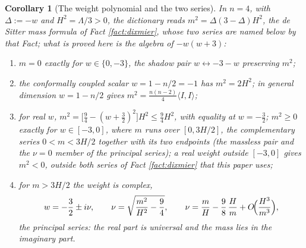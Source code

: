 \documentclass[11pt]{article}
\newtheorem{corollary}[theorem]{Corollary}
\theoremstyle{definition}
\newcommand{\ip}[2]{\langle #1, #2\rangle}
\begin{document}
\begin{corollary}[The weight polynomial and the two series]\label{cor:series}
In $n = 4$, with $\Delta := -w$ and $H^{2} = \Lambda/3 > 0$, the dictionary reads $m^{2} = \Delta(3-\Delta)H^{2}$, the de Sitter mass formula of Fact \ref{fact:dixmier}, whose two series are named below by that Fact; what is proved here is the algebra of $-w(w+3)$:
\begin{enumerate}
\item $m = 0$ exactly for $w \in \{0, -3\}$, the shadow pair $w \leftrightarrow -3-w$ preserving $m^{2}$;
\item the conformally coupled scalar $w = 1 - n/2 = -1$ has $m^{2} = 2H^{2}$; in general dimension $w = 1 - n/2$ gives $m^{2} = \tfrac{n(n-2)}{4}\ip{I}{I}$;
\item for real $w$, $m^{2} = \bigl[\tfrac94 - (w + \tfrac32)^{2}\bigr]H^{2} \le \tfrac94 H^{2}$, with equality at $w = -\tfrac32$; $m^{2} \ge 0$ exactly for $w \in [-3, 0]$, where $m$ runs over $[0, 3H/2]$, the complementary series $0 < m < 3H/2$ together with its two endpoints (the massless pair and the $\nu = 0$ member of the principal series); a real weight outside $[-3,0]$ gives $m^{2} < 0$, outside both series of Fact \ref{fact:dixmier} that this paper uses;
\item for $m > 3H/2$ the weight is complex,
\begin{equation}\label{eq:principal}
w = -\frac32 \pm i\nu, \qquad \nu = \sqrt{\frac{m^{2}}{H^{2}} - \frac94}, \qquad \nu = \frac{m}{H} - \frac98\,\frac{H}{m} + O\!\Bigl(\frac{H^{3}}{m^{3}}\Bigr),
\end{equation}
the principal series: the real part is universal and the mass lies in the imaginary part.
\end{enumerate}
\end{corollary}
\end{document}
